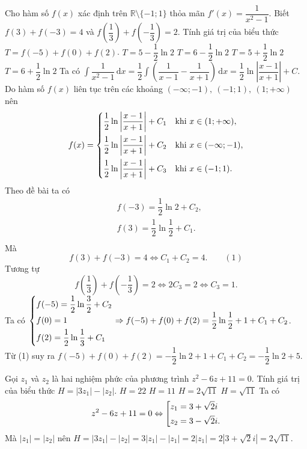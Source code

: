 \begin{ex}%
	Cho hàm số $f(x)$ xác định trên $\mathbb{R}\setminus\{-1;1\}$ thỏa mãn $f'(x)=\dfrac{1}{x^2-1}$. Biết $f(3)+f(-3)=4$ và $f\left(\dfrac{1}{3}\right)+f\left(-\dfrac{1}{3}\right)=2$. Tính giá trị của biểu thức $T=f(-5)+f(0)+f(2)$.
	\choice
	{\True $T=5-\dfrac{1}{2}\ln2$}
	{$T=6-\dfrac{1}{2}\ln2$}
	{$T=5+\dfrac{1}{2}\ln2$}
	{$T=6+\dfrac{1}{2}\ln2$}
	\loigiai
	{
		Ta có $\displaystyle\int \dfrac{1}{x^2-1}\mathrm{\,d}x=\dfrac{1}{2}\displaystyle\int \left(\dfrac{1}{x-1}-\dfrac{1}{x+1}\right)\mathrm{\,d}x=\dfrac{1}{2}\ln\left|\dfrac{x-1}{x+1}\right|+C$.\\
		Do hàm số $f(x)$ liên tục trên các khoảng $(-\infty;-1),~(-1;1),~(1;+\infty)$ nên
		\[f(x)=\left\{\begin{aligned}&\dfrac{1}{2}\ln\left|\dfrac{x-1}{x+1}\right|+C_1\text{\quad khi } x\in(1;+\infty), \\&\dfrac{1}{2}\ln\left|\dfrac{x-1}{x+1}\right|+C_2\text{\quad khi } x\in(-\infty;-1),\\&\dfrac{1}{2}\ln\left|\dfrac{x-1}{x+1}\right|+C_3\text{\quad khi } x\in(-1;1).\end{aligned}\right.\]
		Theo đề bài ta có 
		\begin{eqnarray*}
			& f(-3)=\dfrac{1}{2}\ln2+C_2,\\
			& f(3)=\dfrac{1}{2}\ln\dfrac{1}{2}+C_1.\\
		\end{eqnarray*}
		Mà \[f(3)+f(-3)=4\Leftrightarrow C_1+C_2=4.\qquad(1)\]
		Tương tự 
		\[f\left(\dfrac{1}{3}\right)+f\left(-\dfrac{1}{3}\right)=2\Leftrightarrow 2C_3=2\Leftrightarrow C_3=1.\]
		Ta có $\left\{\begin{aligned}&f(-5)=\dfrac{1}{2}\ln\dfrac{3}{2}+C_2\\&f(0)=1\\&f(2)=\dfrac{1}{2}\ln\dfrac{1}{3}+C_1\end{aligned}\right.\Rightarrow f(-5)+f(0)+f(2)=\dfrac{1}{2}\ln\dfrac{1}{2}+1+C_1+C_2$.\\
		Từ (1) suy ra $f(-5)+f(0)+f(2)=-\dfrac{1}{2}\ln2+1+C_1+C_2=-\dfrac{1}{2}\ln2+5$.
	}
\end{ex}

\begin{ex}%
	Gọi $z_1$ và $z_2$ là hai nghiệm phức của phương trình $z^2-6z+11=0$. Tính giá trị của biểu thức $H=|3z_1|-|z_2|$.
	\choice
	{$H=22$}
	{$H=11$}
	{\True $H=2\sqrt{11}$}
	{$H=\sqrt{11}$}
	\loigiai
	{
		Ta có 
		\[z^2-6z+11=0\Leftrightarrow\left[\begin{aligned}&z_1=3+\sqrt{2}i\\&z_2=3-\sqrt{2}i.\end{aligned}\right.\]
		Mà $|z_1|=|z_2|$
		nên  $H=|3z_1|-|z_2|=3|z_1|-|z_1|=2|z_1|=2\left|3+\sqrt{2}i\right|=2\sqrt{11}$.
	}
\end{ex}

